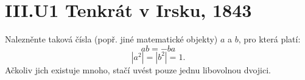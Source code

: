\documentclass{../../../../style/mkimain}
\begin{document}
\section*{III.U1 Tenkrát v Irsku, 1843}
\noindent Nalezněnte taková čísla (popř. jiné matematické objekty) $a$ a $b$, pro která platí:
$$ab=-ba$$
$$|a^2|=|b^2|=1\text{.}$$
Ačkoliv jich existuje mnoho, stačí uvést pouze jednu libovolnou dvojici.
\end{document}

